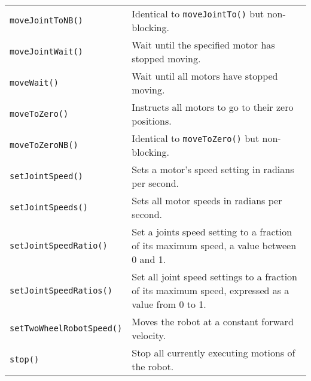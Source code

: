 \begin{table}[!h]
\begin{center}
\begin{tabular}{p{38 mm}p{77 mm}}
\texttt{moveJointToNB()} & Identical to \texttt{moveJointTo()} but non-blocking. \\
\texttt{moveJointWait()} & Wait until the specified motor has stopped moving. \\
\texttt{moveWait()} & Wait until all motors have stopped moving. \\
\texttt{moveToZero()} & Instructs all motors to go to their zero positions. \\
\texttt{moveToZeroNB()} & Identical to \texttt{moveToZero()} but non-blocking. \\
\texttt{setJointSpeed()} & Sets a motor's speed setting in radians per second. \\
\texttt{setJointSpeeds()} & Sets all motor speeds in radians per second. \\
\texttt{setJointSpeedRatio()} & Set a joints speed setting to a fraction of its maximum speed, a value between 0 and 1. \\
\texttt{setJointSpeedRatios()} & Set all joint speed settings to a fraction of its
maximum speed, expressed as a value from 0 to 1. \\
\texttt{setTwoWheelRobotSpeed()} & Moves the robot at a constant forward velocity. \\
\texttt{stop()} & Stop all currently executing motions of the robot. \\
\hline
\end{tabular}
\end{center}
\label{mobilec_api_cbinary}
\end{table}

